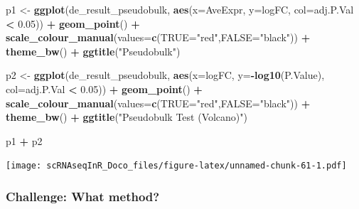 \documentclass[
]{book}
\newenvironment{Shaded}{\begin{snugshade}}{\end{snugshade}}
\newcommand{\AttributeTok}[1]{\textcolor[rgb]{0.13,0.29,0.53}{#1}}
\newcommand{\FloatTok}[1]{\textcolor[rgb]{0.00,0.00,0.81}{#1}}
\newcommand{\FunctionTok}[1]{\textcolor[rgb]{0.13,0.29,0.53}{\textbf{#1}}}
\newcommand{\NormalTok}[1]{#1}
\newcommand{\OtherTok}[1]{\textcolor[rgb]{0.56,0.35,0.01}{#1}}
\newcommand{\SpecialCharTok}[1]{\textcolor[rgb]{0.81,0.36,0.00}{\textbf{#1}}}
\newcommand{\StringTok}[1]{\textcolor[rgb]{0.31,0.60,0.02}{#1}}
\begin{document}
\begin{Shaded}
\begin{Highlighting}[]
\NormalTok{p1 }\OtherTok{\textless{}{-}} \FunctionTok{ggplot}\NormalTok{(de\_result\_pseudobulk, }\FunctionTok{aes}\NormalTok{(}\AttributeTok{x=}\NormalTok{AveExpr, }\AttributeTok{y=}\NormalTok{logFC, }\AttributeTok{col=}\NormalTok{adj.P.Val }\SpecialCharTok{\textless{}} \FloatTok{0.05}\NormalTok{)) }\SpecialCharTok{+}
  \FunctionTok{geom\_point}\NormalTok{() }\SpecialCharTok{+}
  \FunctionTok{scale\_colour\_manual}\NormalTok{(}\AttributeTok{values=}\FunctionTok{c}\NormalTok{(}\StringTok{\textquotesingle{}TRUE\textquotesingle{}}\OtherTok{=}\StringTok{"red"}\NormalTok{,}\StringTok{\textquotesingle{}FALSE\textquotesingle{}}\OtherTok{=}\StringTok{"black"}\NormalTok{)) }\SpecialCharTok{+} 
  \FunctionTok{theme\_bw}\NormalTok{() }\SpecialCharTok{+}
  \FunctionTok{ggtitle}\NormalTok{(}\StringTok{"Pseudobulk"}\NormalTok{)}


\NormalTok{p2 }\OtherTok{\textless{}{-}} \FunctionTok{ggplot}\NormalTok{(de\_result\_pseudobulk, }\FunctionTok{aes}\NormalTok{(}\AttributeTok{x=}\NormalTok{logFC, }\AttributeTok{y=}\SpecialCharTok{{-}}\FunctionTok{log10}\NormalTok{(P.Value), }\AttributeTok{col=}\NormalTok{adj.P.Val }\SpecialCharTok{\textless{}} \FloatTok{0.05}\NormalTok{)) }\SpecialCharTok{+}
  \FunctionTok{geom\_point}\NormalTok{() }\SpecialCharTok{+}
  \FunctionTok{scale\_colour\_manual}\NormalTok{(}\AttributeTok{values=}\FunctionTok{c}\NormalTok{(}\StringTok{\textquotesingle{}TRUE\textquotesingle{}}\OtherTok{=}\StringTok{"red"}\NormalTok{,}\StringTok{\textquotesingle{}FALSE\textquotesingle{}}\OtherTok{=}\StringTok{"black"}\NormalTok{)) }\SpecialCharTok{+} 
  \FunctionTok{theme\_bw}\NormalTok{() }\SpecialCharTok{+}
  \FunctionTok{ggtitle}\NormalTok{(}\StringTok{"Pseudobulk Test (Volcano)"}\NormalTok{)}

\NormalTok{p1 }\SpecialCharTok{+}\NormalTok{ p2}
\end{Highlighting}
\end{Shaded}

\texttt{[image: scRNAseqInR\_Doco\_files/figure-latex/unnamed-chunk-61-1.pdf]}

\hypertarget{challenge-what-method}{%
\subsubsection*{Challenge: What method?}\label{challenge-what-method}}
\end{document}
